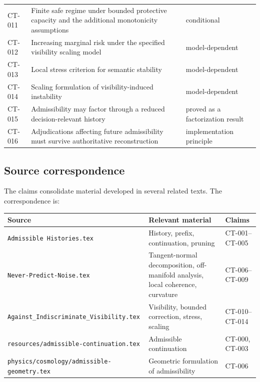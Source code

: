 \documentclass[11pt]{article}
\theoremstyle{definition}
\theoremstyle{remark}
\begin{document}
\begin{center}
\begin{tabular}{@{}p{1.4cm}p{7.3cm}p{4.7cm}@{}}
CT-011 &
Finite safe regime under bounded protective capacity and the additional
monotonicity assumptions &
conditional \\

CT-012 &
Increasing marginal risk under the specified visibility scaling model &
model-dependent \\

CT-013 &
Local stress criterion for semantic stability &
model-dependent \\

CT-014 &
Scaling formulation of visibility-induced instability &
model-dependent \\

CT-015 &
Admissibility may factor through a reduced decision-relevant history &
proved as a factorization result \\

CT-016 &
Adjudications affecting future admissibility must survive authoritative
reconstruction &
implementation principle \\
\bottomrule
\end{tabular}
\end{center}

\subsection{Source correspondence}

The claims consolidate material developed in several related texts. The
correspondence is:

\begin{center}
\small
\begin{tabular}{@{}p{5.3cm}p{5.0cm}p{2.7cm}@{}}
\toprule
Source & Relevant material & Claims \\
\midrule
\texttt{Admissible Histories.tex} &
History, prefix, continuation, pruning &
CT-001--CT-005 \\

\texttt{Never-Predict-Noise.tex} &
Tangent-normal decomposition, off-manifold analysis, local coherence,
curvature &
CT-006--CT-009 \\

\texttt{Against\_Indiscriminate\_Visibility.tex} &
Visibility, bounded correction, stress, scaling &
CT-010--CT-014 \\

\texttt{resources/admissible-continuation.tex} &
Admissible continuation &
CT-000, CT-003 \\

\texttt{physics/cosmology/admissible-geometry.tex} &
Geometric formulation of admissibility &
CT-006 \\
\bottomrule
\end{tabular}
\end{center}
\end{document}
